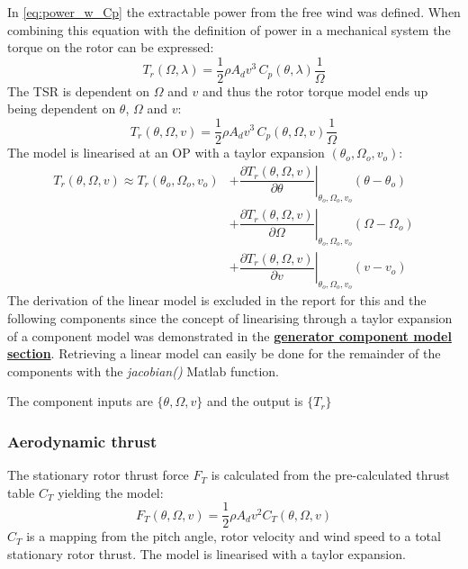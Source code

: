 In \cref{eq:power_w_Cp} the extractable power from the free wind was defined. When combining this equation with the definition of power in a mechanical system the torque on the rotor can be expressed:
\begin{equation}\label{eq:comp_Mrot_lambda}
	T_r(\Omega, \lambda) = \dfrac{1}{2} \rho A_d v^3 \, C_p(\theta, \lambda) \dfrac{1}{\Omega}
\end{equation}
The TSR is dependent on $ \Omega $ and $ v $ and thus the rotor torque model ends up being dependent on $ \theta $, $ \Omega $ and $ v $:
\begin{equation}\label{eq:comp_Mrot_wind}
	T_r(\theta, \Omega, v) = \dfrac{1}{2} \rho A_d v^3 \, C_p(\theta, \Omega, v) \dfrac{1}{\Omega}
\end{equation}
The model is linearised at an OP with a taylor expansion $ (\theta_o, \Omega_o, v_o) $:
\begin{align}
	T_r(\theta, \Omega, v) \approx T_r(\theta_o, \Omega_o, v_o) 
	& + \left. \dfrac{\partial T_r(\theta, \Omega, v)}{\partial \theta} \right |_{\theta_o, \Omega_o, v_o} ( \theta-\theta_o) \\
	& + \left. \dfrac{\partial T_r(\theta, \Omega, v)}{\partial \Omega} \right |_{\theta_o, \Omega_o, v_o} ( \Omega-\Omega_o) \\
	& + \left. \dfrac{\partial T_r(\theta, \Omega, v)}{\partial v} \right |_{\theta_o, \Omega_o, v_o} ( v - v_o)
\end{align}
The derivation of the linear model is excluded in the report for this and the following components since the concept of linearising through a taylor expansion of a component model was demonstrated in the \hyperref[sec:comp_generator]{\textbf{generator component model section}}. Retrieving a linear model can easily be done for the remainder of the components with the \textit{jacobian()} Matlab function.

The component inputs are $ \{\theta, \Omega, v\} $ and the output is $ \{T_r\} $

\subsubsection{Aerodynamic thrust} \label{sec:comp_aero_thrust}
The stationary rotor thrust force $ F_T $ is calculated from the pre-calculated thrust table $ C_T $ yielding the model:
\begin{equation} \label{eq:comp_aero_thrust}
	F_T(\theta, \Omega, v) = \dfrac{1}{2} \rho A_d v^2 C_T(\theta, \Omega, v)
\end{equation}
$ C_T $ is a mapping from the pitch angle, rotor velocity and wind speed to a total stationary rotor thrust. The model is linearised with a taylor expansion.

